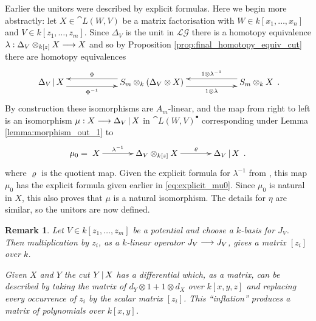 \documentclass[english,letter paper,12pt,leqno]{article}
\theoremstyle{example}
\newtheorem{remark}[theorem]{Remark}
\numberwithin{equation}{section}
\def\LG{\mathcal{LG}}
\begin{document}
Earlier the unitors were described by explicit formulas. Here we begin more abstractly: let $X \in \cat{L}(W,V)$ be a matrix factorisation with $W \in k[x_1,\ldots,x_n]$ and $V \in k[z_1,\ldots,z_m]$. Since $\Delta_V$ is the unit in $\LG$ there is a homotopy equivalence $\lambda: \Delta_V \otimes_{k[z]} X \longrightarrow X$ and so by Proposition \ref{prop:final_homotopy_equiv_cut} there are homotopy equivalences
\begin{equation}
\xymatrix@C+3pc{
\Delta_V \l X \ar@<-1ex>[r]_-{\Phi^{-1}} & S_m \otimes_k ( \Delta_V \otimes X )\ar@<-1ex>[l]_-{\Phi} \ar@<-1ex>[r]_-{1 \otimes \lambda} & S_m \otimes_k X \ar@<-1ex>[l]_-{1 \otimes \lambda^{-1}} 
}\,.
\end{equation}
By construction these isomorphisms are $A_m$-linear, and the map from right to left is an isomorphism $\mu: X \longrightarrow \Delta_V \,|\, X$ in $\cat{L}(W,V)^\bullet$ corresponding under Lemma \ref{lemma:morphism_out_1} to
\[
\mu_0 = \xymatrix@C+1pc{
X \ar[r]^-{\lambda^{-1}} & \Delta_V \otimes_{k[z]} X \ar[r]^-{\varrho} & \Delta_V \l X
}\,.
\]
where $\varrho$ is the quotient map. Given the explicit formula for $\lambda^{-1}$ from \cite[Section 4.1]{lgdual}, this map $\mu_0$ has the explicit formula given earlier in \eqref{eq:explicit_mu0}. Since $\mu_0$ is natural in $X$, this also proves that $\mu$ is a natural isomorphism. The details for $\eta$ are similar, so the unitors are now defined.

\begin{remark}\label{remark:inflation} Let $V \in k[z_1,\ldots,z_m]$ be a potential and choose a $k$-basis for $J_V$. Then multiplication by $z_i$, as a $k$-linear operator $J_V \longrightarrow J_V$, gives a matrix $[z_i]$ over $k$. 

Given $X$ and $Y$ the cut $Y \,|\, X$ has a differential which, as a matrix, can be described by taking the matrix of $d_Y \otimes 1 + 1 \otimes d_X$ over $k[x,y,z]$ and replacing every occurrence of $z_i$ by the scalar matrix $[z_i]$. This ``inflation'' produces a matrix of polynomials over $k[x,y]$. 
\end{remark}
\end{document}
